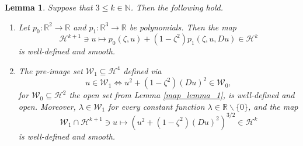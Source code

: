\documentclass[11pt,reqno]{amsart}
\numberwithin{equation}{section}
\def\h{\mathcal{H}}
\def\N{\mathbb{N}}
\def\R{\mathbb{R}}
\newtheorem{lem}{Lemma}[section]
\begin{document}
\begin{lem}\label{map_lemma_2}
Suppose that $3 \le k \in \N$.  Then the following hold.
\begin{enumerate}
 \item Let $p_0: \R^2 \to \R$ and $p_1 : \R^3 \to \R$ be polynomials.  Then the map 
\begin{equation}
 \h^{k+1} \ni u \mapsto   p_0(\zeta,u) + (1-\zeta^2) p_1(\zeta,u,Du)  \in \h^k
\end{equation}
is well-defined and smooth.  

\item The pre-image set $\mathcal{W}_1 \subseteq \h^{4}$ defined via
\begin{equation}
 u \in \mathcal{W}_1  \Leftrightarrow  u^2+ (1-\zeta^2)(Du)^2 \in \mathcal{W}_0,
\end{equation}
for $\mathcal{W}_0 \subseteq \h^2$ the open set from Lemma \ref{map_lemma_1}, is well-defined and open.  Moreover,  $\lambda  \in \mathcal{W}_1$ for every constant function $\lambda \in \R\backslash \{0\}$, and  the map 
\begin{equation}
 \mathcal{W}_1 \cap \h^{k+1} \ni u \mapsto (u^2+ (1-\zeta^2)(Du)^2)^{3/2} \in \h^k
\end{equation}
is well-defined and smooth.
\end{enumerate}
\end{lem}
\end{document}
